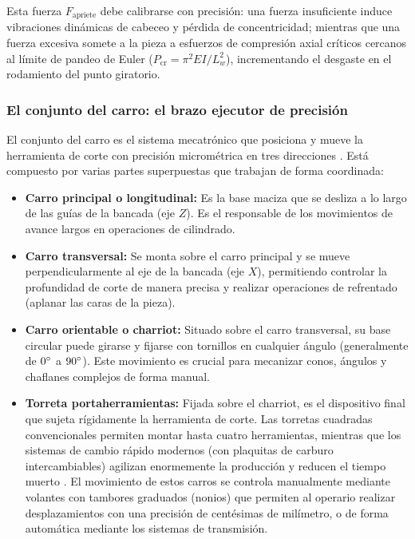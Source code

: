 \documentclass[12pt,a4paper]{article}
\begin{document}
Esta fuerza $F_{\text{apriete}}$ debe calibrarse con precisión: una fuerza insuficiente induce vibraciones dinámicas de cabeceo y pérdida de concentricidad; mientras que una fuerza excesiva somete a la pieza a esfuerzos de compresión axial críticos cercanos al límite de pandeo de Euler ($P_{\text{cr}} = \pi^2 E I / L_w^2$), incrementando el desgaste en el rodamiento del punto giratorio.

\subsubsection{El conjunto del carro: el brazo ejecutor de precisión}
El conjunto del carro es el sistema mecatrónico que posiciona y mueve la herramienta de corte con precisión micrométrica en tres direcciones \cite{chapman2006}. Está compuesto por varias partes superpuestas que trabajan de forma coordinada:
\begin{itemize}[itemsep=3pt, topsep=2pt, parsep=0pt]
    \item \textbf{Carro principal o longitudinal:} Es la base maciza que se desliza a lo largo de las guías de la bancada (eje $Z$). Es el responsable de los movimientos de avance largos en operaciones de cilindrado.
    \item \textbf{Carro transversal:} Se monta sobre el carro principal y se mueve perpendicularmente al eje de la bancada (eje $X$), permitiendo controlar la profundidad de corte de manera precisa y realizar operaciones de refrentado (aplanar las caras de la pieza).
    \item \textbf{Carro orientable o charriot:} Situado sobre el carro transversal, su base circular puede girarse y fijarse con tornillos en cualquier ángulo (generalmente de $0\degree$ a $90\degree$). Este movimiento es crucial para mecanizar conos, ángulos y chaflanes complejos de forma manual.
    \item \textbf{Torreta portaherramientas:} Fijada sobre el charriot, es el dispositivo final que sujeta rígidamente la herramienta de corte. Las torretas cuadradas convencionales permiten montar hasta cuatro herramientas, mientras que los sistemas de cambio rápido modernos (con plaquitas de carburo intercambiables) agilizan enormemente la producción y reducen el tiempo muerto \cite{chapman2006}. El movimiento de estos carros se controla manualmente mediante volantes con tambores graduados (nonios) que permiten al operario realizar desplazamientos con una precisión de centésimas de milímetro, o de forma automática mediante los sistemas de transmisión.
\end{itemize}
\end{document}

